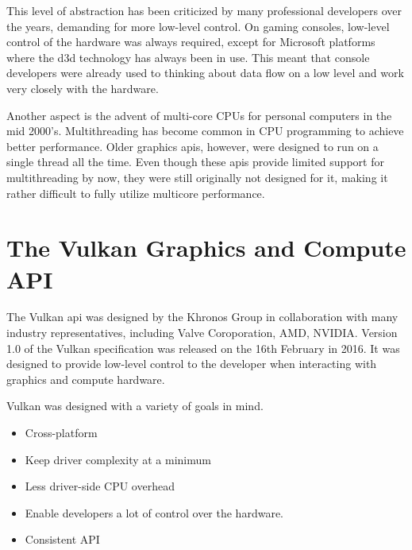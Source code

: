     This level of abstraction has been criticized by many professional developers over the years, demanding for more low-level control.
    On gaming consoles, low-level control of the hardware was always required, except for Microsoft platforms where the \gls{d3d} technology has always been in use.
    This meant that console developers were already used to thinking about data flow on a low level and work very closely with the hardware.

    Another aspect is the advent of multi-core CPUs for personal computers in the mid 2000's.
    Multithreading has become common in CPU programming to achieve better performance.
    Older graphics \glspl{api}, however, were designed to run on a single thread all the time.
    Even though these \glspl{api} provide limited support for multithreading by now, they were still originally not designed for it, making it rather difficult to fully utilize multicore performance.




  \section{The Vulkan Graphics and Compute API}

    The Vulkan \gls{api} was designed by the Khronos Group in collaboration with many industry representatives, including Valve Coroporation, AMD, NVIDIA.
    Version 1.0 of the Vulkan specification was released on the 16th February in 2016.
    It was designed to provide low-level control to the developer when interacting with graphics and compute hardware.

    Vulkan was designed with a variety of goals in mind.

    \begin{itemize}
      \item Cross-platform
      \item Keep driver complexity at a minimum
      \item Less driver-side CPU overhead
      \item Enable developers a lot of control over the hardware.
      \item Consistent API
    \end{itemize}

